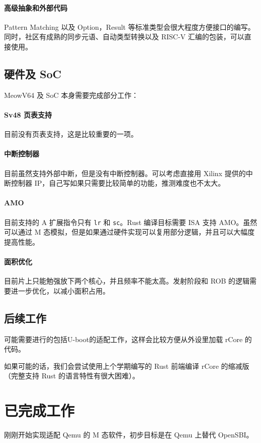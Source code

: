 \documentclass[UTF-8]{ctexart}
\begin{document}
  \paragraph{高级抽象和外部代码} Pattern Matching 以及 Option，Result 等标准类型会很大程度方便接口的编写。同时，社区有成熟的同步元语、自动类型转换以及 RISC-V 汇编的包装，可以直接使用。

  \subsection{硬件及 SoC}
  MeowV64 及 SoC 本身需要完成部分工作：

  \paragraph{Sv48 页表支持} 目前没有页表支持，这是比较重要的一项。

  \paragraph{中断控制器} 目前虽然支持外部中断，但是没有中断控制器。可以考虑直接用 Xilinx 提供的中断控制器 IP，自己写如果只需要比较简单的功能，推测难度也不太大。

  \paragraph{AMO} 目前支持的 A 扩展指令只有 \texttt{lr} 和 \texttt{sc}。Rust 编译目标需要 ISA 支持 AMO。虽然可以通过 M 态模拟，但是如果通过硬件实现可以复用部分逻辑，并且可以大幅度提高性能。

  \paragraph{面积优化} 目前片上只能勉强放下两个核心，并且频率不能太高。发射阶段和 ROB 的逻辑需要进一步优化，以减小面积占用。

  \subsection{后续工作}
  可能需要进行的包括U-boot的适配工作，这样会比较方便从外设里加载 rCore 的代码。

  如果可能的话，我们会尝试使用上个学期编写的 Rust 前端编译 rCore 的缩减版（完整支持 Rust 的语言特性有很大困难）。

  \section{已完成工作}
  刚刚开始实现适配 Qemu 的 M 态软件，初步目标是在 Qemu 上替代 OpenSBI。
\end{document}
